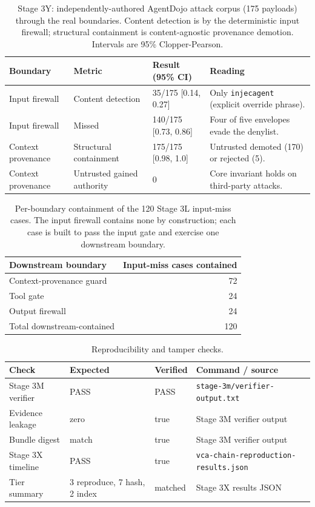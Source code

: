 \documentclass[sigconf,anonymous,review]{acmart}
\begin{document}
\begin{table}[t]
\caption{Stage 3Y: independently-authored AgentDojo attack corpus (175 payloads) through the real boundaries. Content detection is by the deterministic input firewall; structural containment is content-agnostic provenance demotion. Intervals are 95\% Clopper-Pearson.}
\label{tab:thirdparty}
\small
\begin{tabularx}{\textwidth}{Xp{}p{}X}
\toprule
Boundary & Metric & Result (95\% CI) & Reading \\
\midrule
Input firewall & Content detection & 35/175 [0.14, 0.27] & Only \texttt{injecagent} (explicit override phrase). \\
Input firewall & Missed & 140/175 [0.73, 0.86] & Four of five envelopes evade the denylist. \\
Context provenance & Structural containment & 175/175 [0.98, 1.0] & Untrusted demoted (170) or rejected (5). \\
Context provenance & Untrusted gained authority & 0 & Core invariant holds on third-party attacks. \\
\bottomrule
\end{tabularx}
\end{table}

\begin{table}[t]
\caption{Per-boundary containment of the 120 Stage 3L input-miss cases. The input firewall contains none by construction; each case is built to pass the input gate and exercise one downstream boundary.}
\label{tab:ablation}
\small
\centering
\begin{tabular}{lr}
\toprule
Downstream boundary & Input-miss cases contained \\
\midrule
Context-provenance guard & 72 \\
Tool gate & 24 \\
Output firewall & 24 \\
\midrule
Total downstream-contained & 120 \\
\bottomrule
\end{tabular}
\end{table}

\begin{table}[t]
\caption{Reproducibility and tamper checks.}
\label{tab:repro}
\small
\begin{tabularx}{\textwidth}{p{}p{}p{}X}
\toprule
Check & Expected & Verified & Command / source \\
\midrule
Stage 3M verifier & PASS & PASS & \texttt{stage-3m/verifier-output.txt} \\
Evidence leakage & zero & true & Stage 3M verifier output \\
Bundle digest & match & true & Stage 3M verifier output \\
Stage 3X timeline & PASS & true & \texttt{vca-chain-reproduction-results.json} \\
Tier summary & 3 reproduce, 7 hash, 2 index & matched & Stage 3X results JSON \\
\bottomrule
\end{tabularx}
\end{table}
\end{document}
